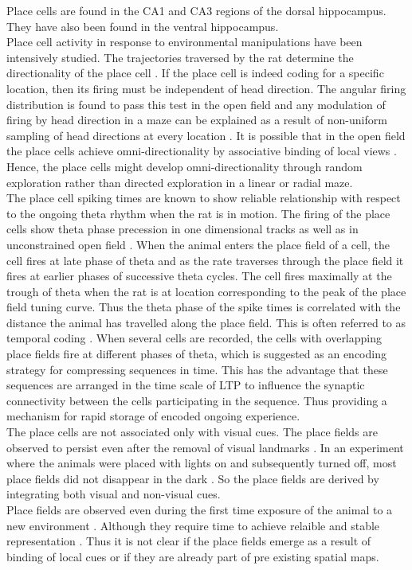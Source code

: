 Place cells are found in the CA1 and CA3 regions of the dorsal hippocampus. They have also been found in the ventral hippocampus. \\ 
Place cell activity in response to environmental manipulations have been intensively studied. The trajectories traversed by the rat determine the directionality of the place cell \cite{Save1998}. If the place cell is indeed coding for a specific location, then its firing must be independent of  head direction. The angular firing distribution is found to pass this test in the open field and any modulation of firing by head direction in a maze can be explained as a result of non-uniform sampling of head directions at every location \cite{Muller1994}. It is possible that in the open field the place cells achieve omni-directionality by associative binding of local views \cite{Sharp1991}. Hence, the place cells might develop omni-directionality through random exploration rather than directed exploration in a linear or radial maze.\\
The place cell spiking times are known to show reliable relationship with respect to the ongoing theta rhythm when the rat is in motion. The firing of the place cells show theta phase precession in one dimensional tracks \cite{O'Keefe1993} as well as in unconstrained open field \cite{Skaggs1996c}. When the animal enters the place field of a cell, the cell fires at late phase of theta and as the rate traverses through the place field it fires at earlier phases of successive theta cycles. The cell fires maximally at the trough of theta when the rat is at location corresponding to the peak of the place field tuning curve. Thus the theta phase of the spike times is correlated with the distance the animal has travelled along the place field. This is often referred to as temporal coding \cite{Huxter2003}. When several cells are recorded, the cells with overlapping place fields fire at different phases of theta, which is suggested as an encoding strategy for compressing sequences in time. This has the advantage that these sequences are arranged in the time scale of LTP to influence the synaptic connectivity between the cells participating in the sequence. Thus providing a mechanism for rapid storage of encoded ongoing experience. \\
The place cells are not associated only with visual cues. The place fields are observed to persist even after the removal of visual landmarks \cite{Kubie1987}. In an experiment where the animals were placed with lights on and subsequently turned off, most place fields did not disappear in the dark \cite{Muller2008}. So the place fields are derived by integrating both visual and non-visual cues. \\
Place fields are observed even during the first time exposure of the animal to a new environment \cite{Reccivcd1978, Tanila1997}. Although they require time to achieve relaible and stable representation \cite{Wilson1993a}. Thus it is not clear if the place fields emerge  as a result of binding of local cues or if they are already part of pre existing spatial maps.  
 
